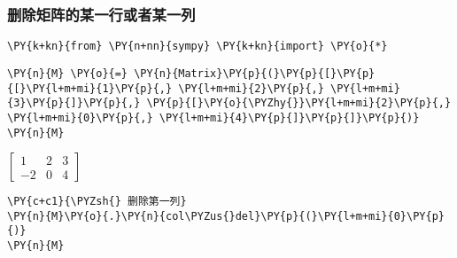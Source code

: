     \hypertarget{ux5220ux9664ux77e9ux9635ux7684ux67d0ux4e00ux884cux6216ux8005ux67d0ux4e00ux5217}{%
\subsubsection{删除矩阵的某一行或者某一列}\label{ux5220ux9664ux77e9ux9635ux7684ux67d0ux4e00ux884cux6216ux8005ux67d0ux4e00ux5217}}

    \begin{tcolorbox}[breakable, size=fbox, boxrule=1pt, pad at break*=1mm,colback=cellbackground, colframe=cellborder]
\begin{Verbatim}[commandchars=\\\{\}]
\PY{k+kn}{from} \PY{n+nn}{sympy} \PY{k+kn}{import} \PY{o}{*}
\end{Verbatim}
\end{tcolorbox}

    \begin{tcolorbox}[breakable, size=fbox, boxrule=1pt, pad at break*=1mm,colback=cellbackground, colframe=cellborder]
\begin{Verbatim}[commandchars=\\\{\}]
\PY{n}{M} \PY{o}{=} \PY{n}{Matrix}\PY{p}{(}\PY{p}{[}\PY{p}{[}\PY{l+m+mi}{1}\PY{p}{,} \PY{l+m+mi}{2}\PY{p}{,} \PY{l+m+mi}{3}\PY{p}{]}\PY{p}{,} \PY{p}{[}\PY{o}{\PYZhy{}}\PY{l+m+mi}{2}\PY{p}{,} \PY{l+m+mi}{0}\PY{p}{,} \PY{l+m+mi}{4}\PY{p}{]}\PY{p}{]}\PY{p}{)}
\PY{n}{M}
\end{Verbatim}
\end{tcolorbox}
 
            
    
    $\displaystyle \left[\begin{matrix}1 & 2 & 3\\-2 & 0 & 4\end{matrix}\right]$

    

    \begin{tcolorbox}[breakable, size=fbox, boxrule=1pt, pad at break*=1mm,colback=cellbackground, colframe=cellborder]
\begin{Verbatim}[commandchars=\\\{\}]
\PY{c+c1}{\PYZsh{} 删除第一列}
\PY{n}{M}\PY{o}{.}\PY{n}{col\PYZus{}del}\PY{p}{(}\PY{l+m+mi}{0}\PY{p}{)}
\PY{n}{M}
\end{Verbatim}
\end{tcolorbox}
 
